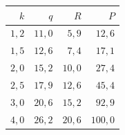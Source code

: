 
\begin{tabular}{@{}rrrr@{}}
\toprule
$k$ & $q$ & $R$ & $P$ \\
\midrule
$1{,}2$ & $11{,}0$ & $5{,}9$ & $12{,}6$ \\
$1{,}5$ & $12{,}6$ & $7{,}4$ & $17{,}1$ \\
$2{,}0$ & $15{,}2$ & $10{,}0$ & $27{,}4$ \\
$2{,}5$ & $17{,}9$ & $12{,}6$ & $45{,}4$ \\
$3{,}0$ & $20{,}6$ & $15{,}2$ & $92{,}9$ \\
$4{,}0$ & $26{,}2$ & $20{,}6$ & $100{,}0$ \\
\bottomrule
\end{tabular}
